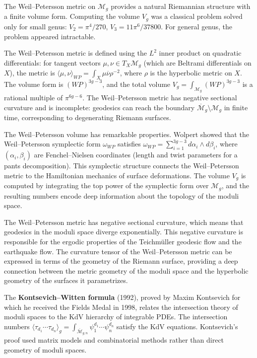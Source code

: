 The Weil--Petersson metric on $\mathcal{M}_g$ provides a natural Riemannian structure with a finite volume form. Computing the volume $V_g$ was a classical problem solved only for small genus: $V_2 = \pi^4/270$, $V_3 = 11\pi^6/37800$. For general genus, the problem appeared intractable.

The Weil--Petersson metric is defined using the $L^2$ inner product on quadratic differentials: for tangent vectors $\mu, \nu \in T_X \mathcal{M}_g$ (which are Beltrami differentials on $X$), the metric is $\langle \mu, \nu \rangle_{WP} = \int_X \mu \overline{\nu} \rho^{-2}$, where $\rho$ is the hyperbolic metric on $X$. The volume form is $(WP)^{3g-3}$, and the total volume $V_g = \int_{\mathcal{M}_g} (WP)^{3g-3}$ is a rational multiple of $\pi^{6g-6}$. The Weil--Petersson metric has negative sectional curvature and is incomplete: geodesics can reach the boundary $\overline{\mathcal{M}}_g \setminus \mathcal{M}_g$ in finite time, corresponding to degenerating Riemann surfaces.

The Weil--Petersson volume has remarkable properties. Wolpert showed that the Weil--Petersson symplectic form $\omega_{WP}$ satisfies $\omega_{WP} = \sum_{i=1}^{3g-3} d\alpha_i \wedge d\beta_i$, where $(\alpha_i, \beta_i)$ are Fenchel--Nielsen coordinates (length and twist parameters for a pants decomposition). This symplectic structure connects the Weil--Petersson metric to the Hamiltonian mechanics of surface deformations. The volume $V_g$ is computed by integrating the top power of the symplectic form over $\mathcal{M}_g$, and the resulting numbers encode deep information about the topology of the moduli space.

The Weil--Petersson metric has negative sectional curvature, which means that geodesics in the moduli space diverge exponentially. This negative curvature is responsible for the ergodic properties of the Teichm\"uller geodesic flow and the earthquake flow. The curvature tensor of the Weil--Petersson metric can be expressed in terms of the geometry of the Riemann surface, providing a deep connection between the metric geometry of the moduli space and the hyperbolic geometry of the surfaces it parametrizes.

The \textbf{Kontsevich--Witten formula} (1992), proved by Maxim Kontsevich for which he received the Fields Medal in 1998, relates the intersection theory of moduli spaces to the KdV hierarchy of integrable PDEs. The intersection numbers $\langle\tau_{d_1}\cdots\tau_{d_n}\rangle_g = \int_{\overline{\mathcal{M}}_{g,n}}\psi_1^{d_1}\cdots\psi_n^{d_n}$ satisfy the KdV equations. Kontsevich's proof used matrix models and combinatorial methods rather than direct geometry of moduli spaces.

